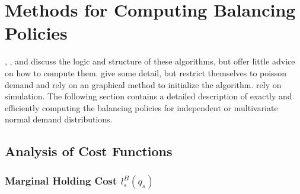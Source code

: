 \documentclass[12pt]{article}
\begin{document}
\section{Methods for Computing Balancing Policies}

\cite{levi:2007}, \cite{levi:2008}, and \cite{levi:2016} discuss the logic and structure of these algorithms, but offer little advice on how to compute them. \cite{yu:2010} give some detail, but restrict themselves to poisson demand and rely on an graphical method to initialize the algorithm. \cite{hurley:2007} rely on simulation. The following section contains a detailed description of exactly and efficiently computing the balancing policies for independent or multivariate normal demand distributions. 

\subsection{Analysis of Cost Functions}

\subsubsection{Marginal Holding Cost $l_s^B(q_s)$}
\end{document}
